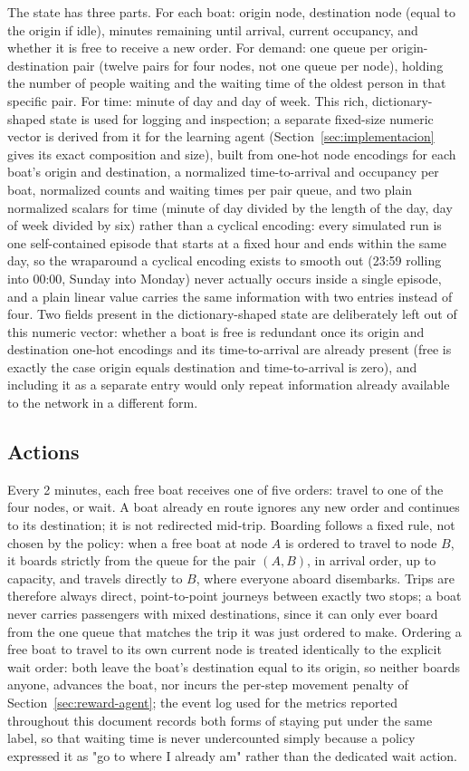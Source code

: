 \documentclass[11pt,a4paper]{article}
\begin{document}
The state has three parts. For each boat: origin node, destination node (equal to the origin if idle), minutes remaining until arrival, current occupancy, and whether it is free to receive a new order. For demand: one queue per origin-destination pair (twelve pairs for four nodes, not one queue per node), holding the number of people waiting and the waiting time of the oldest person in that specific pair. For time: minute of day and day of week. This rich, dictionary-shaped state is used for logging and inspection; a separate fixed-size numeric vector is derived from it for the learning agent (Section~\ref{sec:implementacion} gives its exact composition and size), built from one-hot node encodings for each boat's origin and destination, a normalized time-to-arrival and occupancy per boat, normalized counts and waiting times per pair queue, and two plain normalized scalars for time (minute of day divided by the length of the day, day of week divided by six) rather than a cyclical encoding: every simulated run is one self-contained episode that starts at a fixed hour and ends within the same day, so the wraparound a cyclical encoding exists to smooth out (23:59 rolling into 00:00, Sunday into Monday) never actually occurs inside a single episode, and a plain linear value carries the same information with two entries instead of four. Two fields present in the dictionary-shaped state are deliberately left out of this numeric vector: whether a boat is free is redundant once its origin and destination one-hot encodings and its time-to-arrival are already present (free is exactly the case origin equals destination and time-to-arrival is zero), and including it as a separate entry would only repeat information already available to the network in a different form.

\subsection{Actions}

Every 2 minutes, each free boat receives one of five orders: travel to one of the four nodes, or wait. A boat already en route ignores any new order and continues to its destination; it is not redirected mid-trip. Boarding follows a fixed rule, not chosen by the policy: when a free boat at node $A$ is ordered to travel to node $B$, it boards strictly from the queue for the pair $(A,B)$, in arrival order, up to capacity, and travels directly to $B$, where everyone aboard disembarks. Trips are therefore always direct, point-to-point journeys between exactly two stops; a boat never carries passengers with mixed destinations, since it can only ever board from the one queue that matches the trip it was just ordered to make. Ordering a free boat to travel to its own current node is treated identically to the explicit wait order: both leave the boat's destination equal to its origin, so neither boards anyone, advances the boat, nor incurs the per-step movement penalty of Section~\ref{sec:reward-agent}; the event log used for the metrics reported throughout this document records both forms of staying put under the same label, so that waiting time is never undercounted simply because a policy expressed it as "go to where I already am" rather than the dedicated wait action.
\end{document}
